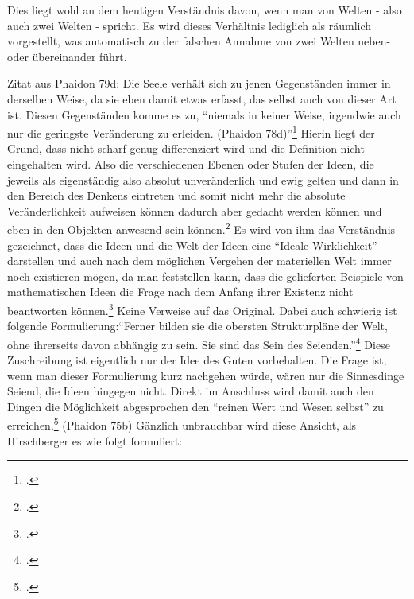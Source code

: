 Dies liegt wohl an dem heutigen Verständnis davon, wenn man von Welten - also auch zwei Welten - spricht. Es wird dieses Verhältnis lediglich als räumlich vorgestellt, was automatisch zu der falschen Annahme von zwei Welten neben- oder übereinander führt.

Zitat aus Phaidon 79d: Die Seele verhält sich zu jenen Gegenständen immer in derselben Weise, da sie eben damit etwas erfasst, das selbst auch von dieser Art ist. Diesen Gegenständen komme es zu, \enquote{niemals in keiner Weise, irgendwie auch nur die geringste Veränderung zu erleiden. (Phaidon 78d)}\footcite[][S. 97]{Hirschberger}
Hierin liegt der Grund, dass nicht scharf genug differenziert wird und die Definition nicht eingehalten wird. Also die verschiedenen Ebenen oder Stufen der Ideen, die jeweils als eigenständig also absolut unveränderlich und ewig gelten und dann in den Bereich des Denkens eintreten und somit nicht mehr die absolute Veränderlichkeit aufweisen können dadurch aber gedacht werden können und eben in den Objekten anwesend sein können.\footcite[vgl.][S. 180f.]{Kutschera}
Es wird von ihm das Verständnis gezeichnet, dass die Ideen und die Welt der Ideen eine \enquote{Ideale Wirklichkeit} darstellen und auch nach dem möglichen Vergehen der materiellen Welt immer noch existieren mögen, da man feststellen kann, dass die gelieferten Beispiele von mathematischen Ideen die Frage nach dem Anfang ihrer Existenz nicht beantworten können.\footcite[vgl.][S. 99]{Hirschberger} Keine Verweise auf das Original. Dabei auch schwierig ist folgende Formulierung:\enquote{Ferner bilden sie die obersten Strukturpläne der Welt, ohne ihrerseits davon abhängig zu sein. Sie sind das Sein des Seienden.}\footcite[][S. 99]{Hirschberger} Diese Zuschreibung ist eigentlich nur der Idee des Guten vorbehalten. Die Frage ist, wenn man dieser Formulierung kurz nachgehen würde, wären nur die Sinnesdinge Seiend, die Ideen hingegen nicht.
Direkt im Anschluss wird damit auch den Dingen die Möglichkeit abgesprochen den \enquote{reinen Wert und Wesen selbst} zu erreichen.\footcite[vgl.][S. 100]{Hirschberger} (Phaidon 75b)
Gänzlich unbrauchbar wird diese Ansicht, als Hirschberger es wie folgt formuliert:
